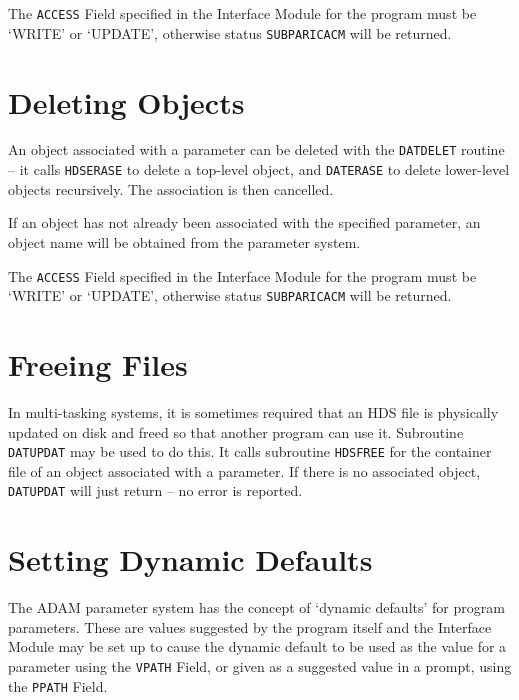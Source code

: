 \documentclass[twoside,11pt]{article}
\newcommand{\htmlref}[2]{#1}
\newcommand{\xref}[3]{#1}
\newcommand{\xlabel}[1]{}
\renewcommand{\_}{\texttt{\symbol{95}}}
\begin{document}
The 
\xref{\texttt{ACCESS} Field}{sun115}{the_access_field}
specified in the Interface Module for the program must be `WRITE' or `UPDATE',
otherwise status \texttt{SUBPAR\_ICACM} will be returned.

\section{\xlabel{deleting_objects}Deleting Objects}
An object associated with a parameter can be deleted with the 
\htmlref{\texttt{DAT\_DELET}}{DAT_DELET}
routine -- it calls
\xref{\texttt{HDS\_ERASE}}{sun92}{HDS_ERASE}
to delete a top-level object, and
\xref{\texttt{DAT\_ERASE}}{sun92}{DAT_ERASE}
to delete lower-level objects recursively.
The association is then cancelled.

If an object has not already been associated with the specified parameter,
an object name will be obtained from the parameter system.

The 
\xref{\texttt{ACCESS} Field}{sun115}{the_access_field}
specified in the Interface Module for the program must be `WRITE' or `UPDATE',
otherwise status \texttt{SUBPAR\_ICACM} will be returned.

\section{\xlabel{freeing_files}Freeing Files}
In multi-tasking systems, it is sometimes required that an HDS file is
physically updated on disk and freed so that another program can use it.
Subroutine
\htmlref{\texttt{DAT\_UPDAT}}{DAT_UPDAT}
may be used to do this. It calls subroutine
\xref{\texttt{HDS\_FREE}}{sun92}{HDS_FREE}
for the container file of an object associated with a parameter. 
If there is no associated object, \texttt{DAT\_UPDAT} will just return 
-- no error is reported.

\section{\xlabel{setting_dynamic_defaults}Setting Dynamic Defaults}
The ADAM parameter system has the concept of `dynamic defaults' for program
parameters. These are values suggested by the program itself and the 
\xref{Interface Module}{sun115}{abstract}
may be set up to cause the dynamic default to be used as the value for a
parameter using the 
\xref{\texttt{VPATH} Field}{sun115}{the_vpath_field},
or given as a suggested value in a prompt, using the
\xref{\texttt{PPATH} Field}{sun115}{the_ppath_field}.
\end{document}
